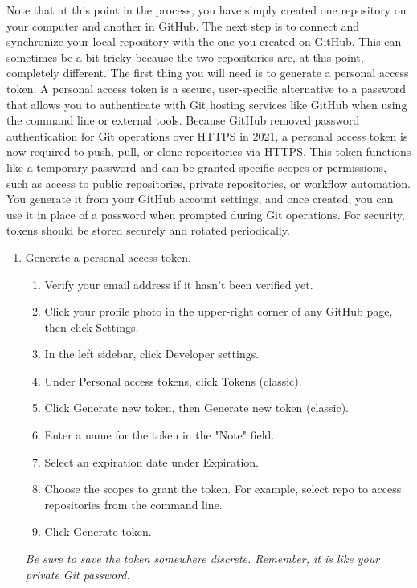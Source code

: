 	Note that at this point in the process, you have simply created one repository on your computer and another in GitHub.  The next step is to connect and synchronize your local repository with the one you created on GitHub.  This can sometimes be a bit tricky because the two repositories are, at this point, completely different.  The first thing you will need is to generate a personal access token. A personal access token is a secure, user-specific alternative to a password that allows you to authenticate with Git hosting services like GitHub when using the command line or external tools. Because GitHub removed password authentication for Git operations over HTTPS in 2021, a personal access token is now required to push, pull, or clone repositories via HTTPS. This token functions like a temporary password and can be granted specific scopes or permissions, such as access to public repositories, private repositories, or workflow automation. You generate it from your GitHub account settings, and once created, you can use it in place of a password when prompted during Git operations. For security, tokens should be stored securely and rotated periodically.


\newpage
\begin{enumerate}[start=3]
	\item Generate a personal access token.
		\begin{enumerate}
			\item Verify your email address if it hasn't been verified yet.
 			\item Click your profile photo in the upper-right corner of any GitHub page, then click Settings.
			\item In the left sidebar, click Developer settings.
			\item Under Personal access tokens, click Tokens (classic).
			\item Click Generate new token, then Generate new token (classic).
			\item Enter a name for the token in the "Note" field.
			\item Select an expiration date under Expiration.
			\item Choose the scopes to grant the token. For example, select repo to access repositories from the command line.
			\item Click Generate token.
		\end{enumerate}
		\emph{Be sure to save the token somewhere discrete.  Remember, it is like your private Git password.}
		
\end{enumerate}
		
